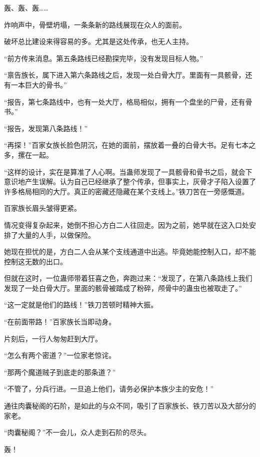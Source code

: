 
\begin{this_body}



轰、轰、轰……

炸响声中，骨壁坍塌，一条条新的路线展现在众人的面前。

破坏总比建设来得容易的多。尤其是这处传承，也无人主持。

“前方传来消息。第五条路线已经勘探完毕，没有发现目标人物。”

“禀告族长，属下进入第六条路线之后，发现一处白骨大厅。里面有一具骸骨，还有一本巨大的骨书。”

“报告，第七条路线中，也有一处大厅，格局相似，拥有一个盘坐的尸骨，还有骨书。”

“报告，发现第八条路线！”

“再探！”百家女族长脸色阴沉，在她的面前，摆放着一叠的白骨大书。足有七本之多，摞在一起。

“这样的设计，实在是算准了人心啊。当蛊师发现了一具骸骨和骨书之后，就会下意识地产生误解。认为自己已经继承了整个传承，但事实上，灰骨才子陷入设置了许多格局相同的大厅。真正的密藏还隐藏在某个支线上。”铁刀苦在一旁感慨道。

百家族长眉头皱得更紧。

情况变得复杂起来，她倒不担心方白二人往回走。因为之前，她早就在这入口处安排了大量的人手，以做保险。

她现在担忧的是，方白二人会从某个支线通道中出逃。毕竟她能控制入口，却不能控制这无数的出口。

但就在这时，一位蛊师带着狂喜之色，奔跑过来：“发现了，在第八条路线上我们发现了一处白骨大厅。里面的骸骨被踏成了粉碎，颅骨中的蛊虫也被取走了。”

“这一定就是他们的路线！”铁刀苦顿时精神大振。

“在前面带路！”百家族长当即动身。

片刻后，一行人匆匆赶到大厅。

“怎么有两个密道？”一位家老惊诧。

“那两个魔道贼子到底走的那条道？”

“不管了，分兵行进。一旦追上他们，请务必保护本族少主的安危！”

通往肉囊秘阁的石阶，是如此的与众不同，吸引了百家族长、铁刀苦以及大部分的家老。

“肉囊秘阁？”不一会儿，众人走到石阶的尽头。

轰！


\end{this_body}
